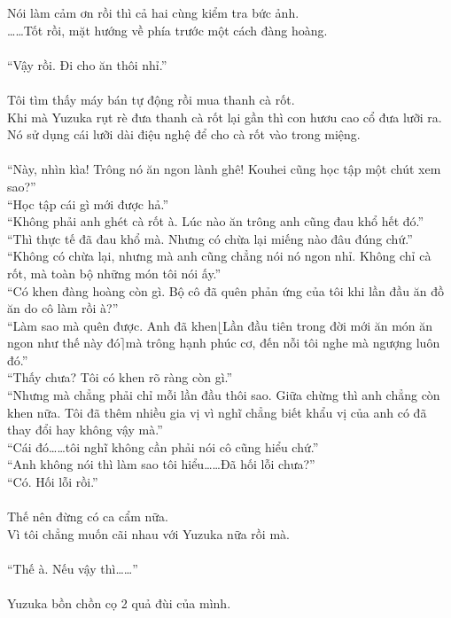 \documentclass[12pt,a4paper, twosides]{book}
\begin{document}
Nói làm cảm ơn rồi thì cả hai cùng kiểm tra bức ảnh.\\
……Tốt rồi, mặt hướng về phía trước một cách đàng hoàng.\\
\\
“Vậy rồi. Đi cho ăn thôi nhỉ.”\\
\\
Tôi tìm thấy máy bán tự động rồi mua thanh cà rốt.\\
Khi mà Yuzuka rụt rè đưa thanh cà rốt lại gần thì con hươu cao cổ đưa lưỡi ra.\\
Nó sử dụng cái lưỡi dài điệu nghệ để cho cà rốt vào trong miệng.\\
\\
“Này, nhìn kìa! Trông nó ăn ngon lành ghê! Kouhei cũng học tập một chút xem sao?”\\
“Học tập cái gì mới được hả.”\\
“Không phải anh ghét cà rốt à. Lúc nào ăn trông anh cũng đau khổ hết đó.”\\
“Thì thực tế đã đau khổ mà. Nhưng có chừa lại miếng nào đâu đúng chứ.”\\
“Không có chừa lại, nhưng mà anh cũng chẳng nói nó ngon nhỉ. Không chỉ cà rốt, mà toàn bộ những món tôi nói ấy.”\\
“Có khen đàng hoàng còn gì. Bộ cô đã quên phản ứng của tôi khi lần đầu ăn đồ ăn do cô làm rồi à?”\\
“Làm sao mà quên được. Anh đã khen$\lfloor$Lần đầu tiên trong đời mới ăn món ăn ngon như thế này đó$\rceil$mà trông hạnh phúc cơ, đến nỗi tôi nghe mà ngượng luôn đó.”\\
“Thấy chưa? Tôi có khen rõ ràng còn gì.”\\
“Nhưng mà chẳng phải chỉ mỗi lần đầu thôi sao. Giữa chừng thì anh chẳng còn khen nữa. Tôi đã thêm nhiều gia vị vì nghĩ chẳng biết khẩu vị của anh có đã thay đổi hay không vậy mà.”\\
“Cái đó……tôi nghĩ không cần phải nói cô cũng hiểu chứ.”\\
“Anh không nói thì làm sao tôi hiểu……Đã hối lỗi chưa?”\\
“Có. Hối lỗi rồi.”\\
\\
Thế nên đừng có ca cẩm nữa.\\
Vì tôi chẳng muốn cãi nhau với Yuzuka nữa rồi mà.\\
\\
“Thế à. Nếu vậy thì……”\\
\\
Yuzuka bồn chồn cọ 2 quả đùi của mình.\\
\end{document}
